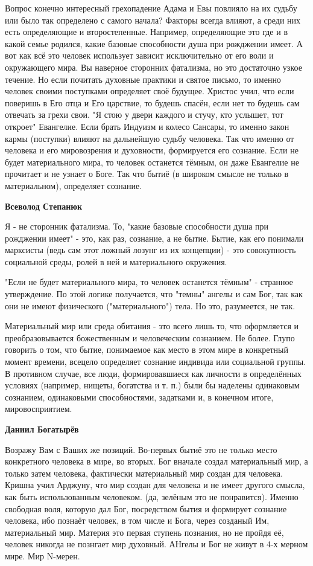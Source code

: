 \begin{itemize}
\begin{itemize}
Вопрос конечно интересный грехопадение Адама и Евы повлияло на их судьбу или
было так определено с самого начала? Факторы всегда влияют, а среди них есть
определяющие и второстепенные. Например, определяющие это где и в какой семье
родился, какие базовые способности душа при рожджении имеет. А вот как всё это
человек использует зависит исключительно от его воли и окружающего мира. Вы
наверное сторонних фатализма, но это достаточно узкое течение. Но если почитать
духовные практики и святое письмо, то именно человек своими поступками
определяет своё будущее. Христос учил, что если поверишь в Его отца и Его
царствие, то будешь спасён, если нет то будешь сам отвечать за грехи свои. "Я
стою у двери каждого и стучу, кто услышет, тот откроет" Евангелие. Если брать
Индуизм и колесо Сансары, то именно закон кармы (поступки) влияют на дальнейшую
судьбу человека. Так что именно от человека и его мировозрения и духовности,
формируется его сознание. Если не будет материального мира, то человек
останется тёмным, он даже Евангелие не прочитает и не узнает о Боге. Так что
бытиё (в широком смысле не только в материальном), определяет сознание.

\textbf{Всеволод Степанюк} 

Я - не сторонник фатализма. То, "какие базовые способности душа при рожджении
имеет" - это, как раз, сознание, а не бытие. Бытие, как его понимали марксисты
(ведь сам этот ложный лозунг из их концепции) - это совокупность социальной
среды, ролей в ней и материального окружения.

"Если не будет материального мира, то человек останется тёмным" - странное
утверждение. По этой логике получается, что "темны" ангелы и сам Бог, так как
они не имеют физического ("материального") тела. Но это, разумеется, не так.

Материальный мир или среда обитания - это всего лишь то, что оформляется и
преобразовывается божественным и человеческим сознанием. Не более. Глупо
говорить о том, что бытие, понимаемое как место в этом мире в конкретный момент
времени, всецело определяет сознание индивида или социальной группы. В
противном случае, все люди, формировавшиеся как личности в определённых
условиях (например, нищеты, богатства и т. п.) были бы наделены одинаковым
сознанием, одинаковыми способностями, задатками и, в конечном итоге,
мировосприятием.

\textbf{Даниил Богатырёв} 

Возражу Вам с Ваших же позиций. Во-первых бытиё это не только место конкретного
человека в мире, во вторых. Бог вначале создал материальный мир, а только затем
человека, фактически материальный мир создан для человека. Кришна учил Арджуну,
что мир создан для человека и не имеет другого смысла, как быть использованным
человеком. (да, зелёным это не понравится). Именно свободная воля, которую дал
Бог, посредством бытия и формирует сознание человека, ибо познаёт человек, в
том числе и Бога, через созданый Им, материальный мир. Материя это первая
ступень познания, но не пройдя её, человек никогда не познгает мир духовный.
АНгелы и Бог не живут в 4-х мерном мире. Мир N-мерен.


\end{itemize}
\end{itemize}
